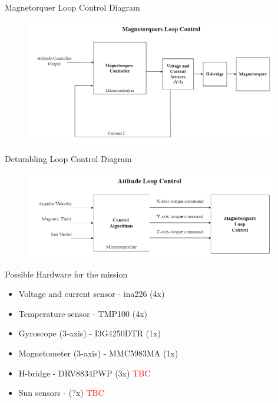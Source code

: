 \documentclass{beamer}
\begin{document}
\begin{frame}{Magnetorquer Loop Control Diagram}

    \begin{figure}[!ht]
        \begin{center}
            \includegraphics[width=11cm]{figures/Malha_Magnetorquers.drawio (2).png}
        \end{center}
    \end{figure}

\end{frame}

\begin{frame}{Detumbling Loop Control Diagram}

    \begin{figure}[!ht]
        \begin{center}
            \includegraphics[width=11cm]{figures/Malha_Attitude_controller.drawio.png}
        \end{center}
    \end{figure}

\end{frame}

\begin{frame}{Possible Hardware for the mission}

    \begin{itemize}
        \item Voltage and current sensor - ina226 (4x) 
        \item Temperature sensor - TMP100 (4x)
        \item Gyroscope (3-axis) -  I3G4250DTR (1x)
        \item Magnetometer (3-axis) - MMC5983MA (1x)
        \item H-bridge - DRV8834PWP (3x) \textcolor{red}{TBC}
        \item Sun sensors - (?x) \textcolor{red}{TBC}
    \end{itemize}

\end{frame}
\end{document}
